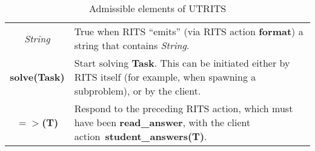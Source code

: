 \documentclass[a4paper,11pt]{article}
\begin{document}
\begin{table}[ht]
  \centering
  \begin{tabular}{cp{7cm}}
    \hline
    \textit{String} & True when RITS ``emits'' (via RITS action \textbf{format}) a string that contains \textit{String}. \\
    \textbf{solve(Task)} & Start solving \textbf{Task}. This can be initiated either by RITS itself (for example, when spawning a subproblem), or by the client.\\
    \textbf{$=>$(T)} & Respond to the preceding RITS action, which must have been \textbf{read\_answer}, with the client action~\textbf{student\_answers(T)}. \\
    \hline
  \end{tabular}
\caption{Admissible elements of UTRITS}
  \label{tab:utrits}
\end{table}



\vfil
\end{document}
